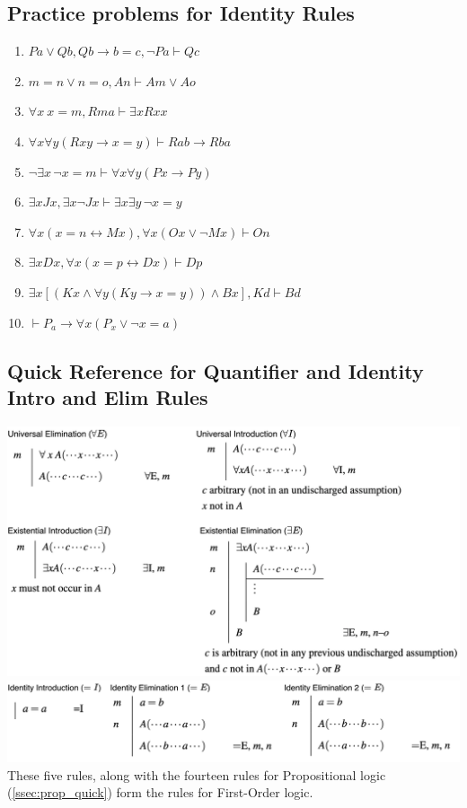 \subsection{Practice problems for Identity Rules}
\begin{enumerate}
    \item $Pa \lor Qb, Qb \to b = c, \neg Pa \vdash Qc$
    \item $m = n \lor n = o, An \vdash Am \lor Ao$
    \item $\forall x \ x = m, Rma \vdash \exists x Rxx$
    \item $\forall x \forall y (Rxy \rightarrow x = y) \vdash R{ab} \to R{ba}$
    \item $\neg \exists x \, \neg x = m \vdash \forall x \forall y (Px \to Py)$
    \item $\exists x Jx, \exists x \neg Jx \vdash \exists x \exists y \, \neg x = y$
    \item $\forall x (x = n \leftrightarrow Mx), \forall x (Ox \lor \neg Mx) \vdash On$
    \item $\exists x Dx, \forall x (x = p \leftrightarrow Dx) \vdash Dp$
    \item $\exists x [(Kx \wedge \forall y (Ky \to x = y)) \wedge Bx], Kd \vdash Bd$
    \item $\vdash P_a \to \forall x (P_x \lor \neg x = a)$
\end{enumerate}
\newpage
\begin{center}
    \subsection{Quick Reference for Quantifier and Identity Intro and Elim Rules} \vspace{0.3in}
    \label{ssec:quant_quick}
    \includegraphics[width=1.1\textwidth]{Figures/Quant_rules_no_background.png} \\  \vspace{0.3in} \steezybreak 
    \includegraphics[width=1.1\textwidth]{Figures/Identity_rules_no_background.png} \\ \steezybreak
    These five rules, along with the fourteen rules for Propositional logic (\ref{ssec:prop_quick}) form the rules for First-Order logic.
\end{center}
\newpage
